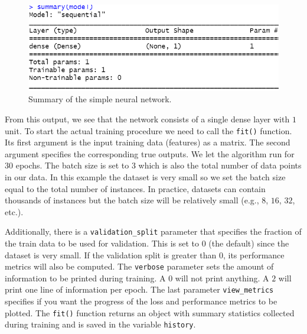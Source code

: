 \documentclass[
  11pt,
]{krantz}
\newenvironment{Shaded}{\begin{snugshade}}{\end{snugshade}}
\newcommand{\AttributeTok}[1]{\textcolor[rgb]{0.61,0.61,0.61}{#1}}
\newcommand{\ConstantTok}[1]{\textcolor[rgb]{0,0,0}{#1}}
\newcommand{\DecValTok}[1]{\textcolor[rgb]{0.06,0.06,0.06}{#1}}
\newcommand{\FunctionTok}[1]{\textcolor[rgb]{0,0,0}{#1}}
\newcommand{\NormalTok}[1]{#1}
\newcommand{\OtherTok}[1]{\textcolor[rgb]{0.37,0.37,0.37}{#1}}
\newcommand{\SpecialCharTok}[1]{\textcolor[rgb]{0,0,0}{#1}}
\begin{document}
\begin{figure}

{\centering \includegraphics[width=0.8\linewidth]{images/nn_simple_summary} 

}

\caption{Summary of the simple neural network.}\label{fig:simpleSummary}
\end{figure}

From this output, we see that the network consists of a single dense layer with \(1\) unit.
To start the actual training procedure we need to call the \texttt{fit()} function. Its first argument is the input training data (features) as a matrix. The second argument specifies the corresponding true outputs. We let the algorithm run for \(30\) epochs. The batch size is set to \(3\) which is also the total number of data points in our data. In this example the dataset is very small so we set the batch size equal to the total number of instances. In practice, datasets can contain thousands of instances but the batch size will be relatively small (e.g., \(8\), \(16\), \(32\), etc.).

Additionally, there is a \texttt{validation\_split} parameter that specifies the fraction of the train data to be used for validation. This is set to \(0\) (the default) since the dataset is very small. If the validation split is greater than \(0\), its performance metrics will also be computed. The \texttt{verbose} parameter sets the amount of information to be printed during training. A \(0\) will not print anything. A \(2\) will print one line of information per epoch. The last parameter \texttt{view\_metrics} specifies if you want the progress of the loss and performance metrics to be plotted. The \texttt{fit()} function returns an object with summary statistics collected during training and is saved in the variable \texttt{history}.

\begin{Shaded}
\end{Shaded}
\end{document}
